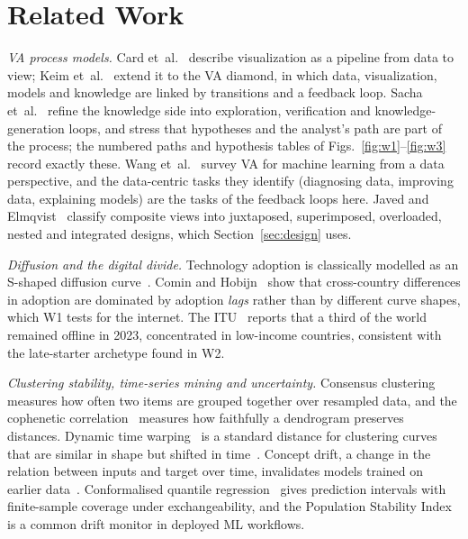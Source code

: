 \documentclass[conference,a4paper]{IEEEtran}
\begin{document}
\section{Related Work}\label{sec:related}
\textit{VA process models.} Card et~al.~\cite{card1999} describe visualization as a pipeline from
data to view; Keim et~al.~\cite{keim2008scope,keim2008challenges} extend it to the VA diamond, in
which data, visualization, models and knowledge are linked by transitions and a feedback loop.
Sacha et~al.~\cite{sacha2014} refine the knowledge side into exploration, verification and
knowledge-generation loops, and stress that hypotheses and the analyst's path are part of the
process; the numbered paths and hypothesis tables of Figs.~\ref{fig:w1}--\ref{fig:w3} record exactly
these. Wang et~al.~\cite{wang2024va4ml} survey VA for machine learning from a data perspective, and
the data-centric tasks they identify (diagnosing data, improving data, explaining models) are the
tasks of the feedback loops here. Javed and Elmqvist~\cite{javed2012composite} classify composite
views into juxtaposed, superimposed, overloaded, nested and integrated designs, which
Section~\ref{sec:design} uses.

\textit{Diffusion and the digital divide.} Technology adoption is classically modelled as an
S-shaped diffusion curve~\cite{rogers2003}. Comin and Hobijn~\cite{comin2010} show that cross-country
differences in adoption are dominated by adoption \emph{lags} rather than by different curve shapes,
which W1 tests for the internet. The ITU~\cite{itu2023} reports that a third of the world remained
offline in 2023, concentrated in low-income countries, consistent with the late-starter archetype
found in W2.

\textit{Clustering stability, time-series mining and uncertainty.} Consensus
clustering~\cite{monti2003consensus} measures how often two items are grouped together over resampled
data, and the cophenetic correlation~\cite{sokal1962cophenetic} measures how faithfully a dendrogram
preserves distances. Dynamic time warping~\cite{sakoe1978dtw} is a standard distance for clustering
curves that are similar in shape but shifted in time~\cite{aghabozorgi2015}. Concept drift, a change in
the relation between inputs and target over time, invalidates models trained on earlier
data~\cite{gama2014}. Conformalised quantile regression~\cite{romano2019cqr} gives prediction intervals
with finite-sample coverage under exchangeability, and the Population Stability Index~\cite{siddiqi2006}
is a common drift monitor in deployed ML workflows.
\end{document}
